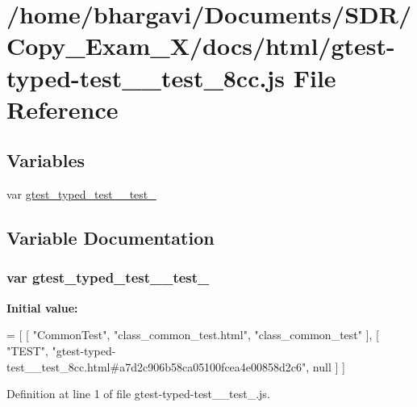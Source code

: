 \hypertarget{gtest-typed-test____test__8cc_8js}{}\section{/home/bhargavi/\+Documents/\+S\+D\+R/\+Copy\+\_\+\+Exam\+\_\+X/docs/html/gtest-\/typed-\/test\+\_\+\+\_\+test\+\_\+8cc.js File Reference}
\label{gtest-typed-test____test__8cc_8js}
\subsection*{Variables}
\begin{DoxyCompactItemize}
\item 
var \hyperlink{gtest-typed-test____test__8cc_8js_a8ab61e7cde9213245c4f920d0826c131}{gtest\+\_\+typed\+\_\+test\+\_\+\+\_\+test\+\_}
\end{DoxyCompactItemize}


\subsection{Variable Documentation}
\subsubsection[{\texorpdfstring{gtest\+\_\+typed\+\_\+test\+\_\+\+\_\+test\+\_\+8cc}{gtest_typed_test__test_8cc}}]{\setlength{\rightskip}{0pt plus 5cm}var gtest\+\_\+typed\+\_\+test\+\_\+\+\_\+test\+\_}\hypertarget{gtest-typed-test____test__8cc_8js_a8ab61e7cde9213245c4f920d0826c131}{}\label{gtest-typed-test____test__8cc_8js_a8ab61e7cde9213245c4f920d0826c131}
{\bfseries Initial value\+:}
\begin{DoxyCode}
=
[
    [ \textcolor{stringliteral}{"CommonTest"}, \textcolor{stringliteral}{"class\_common\_test.html"}, \textcolor{stringliteral}{"class\_common\_test"} ],
    [ \textcolor{stringliteral}{"TEST"}, \textcolor{stringliteral}{"gtest-typed-test\_\_test\_8cc.html#a7d2c906b58ca05100fcea4e00858d2c6"}, null ]
]
\end{DoxyCode}


Definition at line 1 of file gtest-\/typed-\/test\+\_\+\+\_\+test\+\_.\+js.

